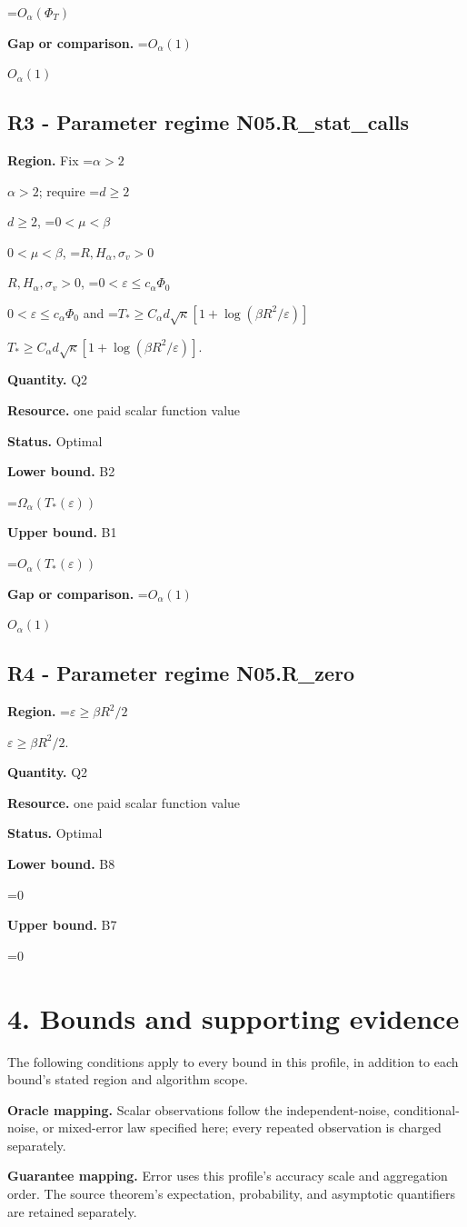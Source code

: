 \documentclass[10pt,a4paper]{article}
\newcommand{\AtlasMath}[1]{\par\begingroup\centering\setbox0=\hbox{$\displaystyle #1$}\ifdim\wd0>1.4\linewidth\typeout{ATLAS WIDE FORMULA: \the\wd0}\fi\ifdim\wd0>\linewidth\resizebox{\linewidth}{!}{\box0}\else\box0\fi\par\endgroup}
\newcommand{\AtlasInlineMath}[1]{\begingroup\setbox0=\hbox{$#1$}\ifdim\wd0>.4\linewidth\endgroup\AtlasMath{#1}\else\endgroup$#1$\fi}
\begin{document}
\AtlasMath{O_\alpha(\Phi_T)}
\textbf{Gap or comparison.} \AtlasInlineMath{O_\alpha(1)}

\subsection{R3 - Parameter regime N05.R\_stat\_calls}
\textbf{Region.} Fix \AtlasInlineMath{\alpha>2}; require \AtlasInlineMath{d\ge2}, \AtlasInlineMath{0<\mu<\beta}, \AtlasInlineMath{R,H_\alpha,\sigma_v>0}, \AtlasInlineMath{0<\varepsilon\le c_\alpha\Phi_0} and \AtlasInlineMath{T_*\ge C_\alpha d\sqrt\kappa[1+\log(\beta R^2/\varepsilon)]}.

\textbf{Quantity.} Q2

\textbf{Resource.} one paid scalar function value

\textbf{Status.} Optimal

\textbf{Lower bound.} B2

\AtlasMath{\Omega_\alpha(T_*(\varepsilon))}
\textbf{Upper bound.} B1

\AtlasMath{O_\alpha(T_*(\varepsilon))}
\textbf{Gap or comparison.} \AtlasInlineMath{O_\alpha(1)}

\subsection{R4 - Parameter regime N05.R\_zero}
\textbf{Region.} \AtlasInlineMath{\varepsilon\ge\beta R^2/2}.

\textbf{Quantity.} Q2

\textbf{Resource.} one paid scalar function value

\textbf{Status.} Optimal

\textbf{Lower bound.} B8

\AtlasMath{0}
\textbf{Upper bound.} B7

\AtlasMath{0}
\section{4. Bounds and supporting evidence}
The following conditions apply to every bound in this profile, in addition to each bound's stated region and algorithm scope.

\textbf{Oracle mapping.} Scalar observations follow the independent-noise, conditional-noise, or mixed-error law specified here; every repeated observation is charged separately.

\textbf{Guarantee mapping.} Error uses this profile's accuracy scale and aggregation order. The source theorem's expectation, probability, and asymptotic quantifiers are retained separately.
\end{document}
